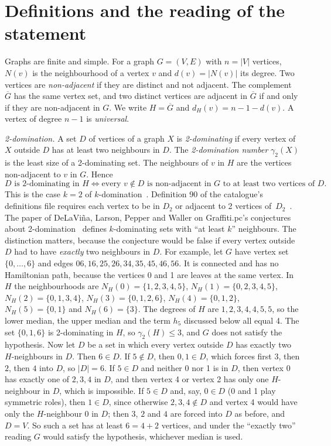 \documentclass[11pt,a4paper]{article}
\theoremstyle{remark}
\newcommand{\Gc}{\overline{G}}
\begin{document}
\section{Definitions and the reading of the statement}\label{sec:defs}

Graphs are finite and simple. For a graph $G=(V,E)$ with $n=|V|$ vertices, $N(v)$ is the
neighbourhood of a vertex $v$ and $d(v)=|N(v)|$ its degree. Two vertices are
\emph{non-adjacent} if they are distinct and not adjacent. The complement $\Gc$ has the same
vertex set, and two distinct vertices are adjacent in $\Gc$ if and only if they are non-adjacent
in $G$. We write $H=\Gc$ and $d_H(v)=n-1-d(v)$. A vertex of degree $n-1$ is \emph{universal}.

\emph{2-domination.} A set $D$ of vertices of a graph $X$ is \emph{2-dominating} if every vertex
of $X$ outside $D$ has at least two neighbours in $D$. The \emph{2-domination number}
$\gamma_2(X)$ is the least size of a 2-dominating set. The neighbours of $v$ in $H$ are the
vertices non-adjacent to $v$ in $G$. Hence
\begin{equation}\label{eq:twodom}
  D\text{ is 2-dominating in }H \iff
  \text{every }v\notin D\text{ is non-adjacent in }G\text{ to at least two vertices of }D.
\end{equation}
This is the case $k=2$ of $k$-domination~\cite{fj}. Definition 90 of the catalogue's definitions
file requires each vertex to be in $D_2$ or adjacent to 2 vertices of~$D_2$~\cite{wowii}. The
paper of DeLaVi\~na, Larson, Pepper and Waller on Graffiti.pc's conjectures about
2-domination~\cite{dlpw} defines $k$-dominating sets with ``at least $k$'' neighbours. The
distinction matters, because the conjecture would be false if every vertex outside $D$ had to
have \emph{exactly} two neighbours in $D$. For example, let $G$ have vertex set $\{0,\dots,6\}$
and edges $06,16,25,26,34,35,45,46,56$. It is connected and has no Hamiltonian path, because the
vertices 0 and 1 are leaves at the same vertex. In $H$ the neighbourhoods are
$N_H(0)=\{1,2,3,4,5\}$, $N_H(1)=\{0,2,3,4,5\}$, $N_H(2)=\{0,1,3,4\}$, $N_H(3)=\{0,1,2,6\}$,
$N_H(4)=\{0,1,2\}$, $N_H(5)=\{0,1\}$ and $N_H(6)=\{3\}$. The degrees of $H$ are
$1,2,3,4,4,5,5$, so the lower median, the upper median and the term $h_5$ discussed below all
equal 4. The set $\{0,1,6\}$ is 2-dominating in $H$, so $\gamma_2(H)\le 3$, and $G$ does not
satisfy the hypothesis. Now let $D$ be a set in which every vertex outside $D$ has exactly two
$H$-neighbours in $D$. Then $6\in D$. If $5\notin D$, then $0,1\in D$, which forces first $3$,
then $2$, then $4$ into $D$, so $|D|=6$. If $5\in D$ and neither 0 nor 1 is in $D$, then
vertex 0 has exactly one of $2,3,4$ in $D$, and then vertex 4 or vertex 2 has only one
$H$-neighbour in $D$, which is impossible. If $5\in D$ and, say, $0\in D$ (0 and 1 play
symmetric roles), then $1\in D$, since otherwise $2,3,4\notin D$ and vertex 4 would have only the
$H$-neighbour 0 in $D$; then $3$, $2$ and $4$ are forced into $D$ as before, and $D=V$. So such a
set has at least $6=4+2$ vertices, and under the ``exactly two'' reading $G$ would satisfy the
hypothesis, whichever median is used.
\end{document}
